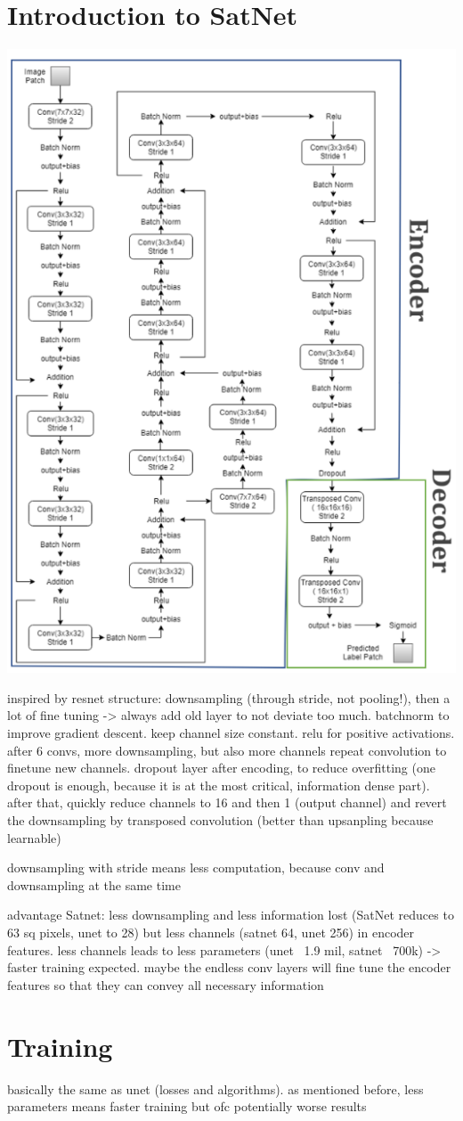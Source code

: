\section{Introduction to SatNet}

\begin{center}
\includegraphics[width=.7\linewidth]{images/satnet_structure}
\end{center}
inspired by resnet
structure: downsampling (through stride, not pooling!), then a lot of fine tuning -> always add old layer to not deviate too much. batchnorm to improve gradient descent. keep channel size constant. relu for positive activations. after 6 convs, more downsampling, but also more channels
repeat convolution to finetune new channels. dropout layer after encoding, to reduce overfitting (one dropout is enough, because it is at the most critical, information dense part).
after that, quickly reduce channels to 16 and then 1 (output channel) and revert the downsampling by transposed convolution (better than upsanpling because learnable)

downsampling with stride means less computation, because conv and downsampling at the same time

advantage Satnet: less downsampling and less information lost (SatNet reduces to 63 sq pixels, unet to 28) but less channels (satnet 64, unet 256) in encoder features. less channels leads to less parameters (unet ~1.9 mil, satnet ~700k) -> faster training expected. maybe the endless conv layers will fine tune the encoder features so that they can convey all necessary information

\section{Training}
basically the same as unet (losses and algorithms). as mentioned before, less parameters means faster training but ofc potentially worse results
